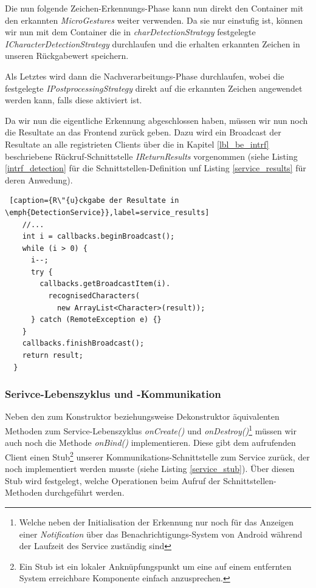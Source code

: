 Die nun folgende Zeichen-Erkennungs-Phase kann nun direkt den Container mit den erkannten \emph{MicroGestures} weiter verwenden. Da sie nur einstufig ist, können wir nun mit dem Container die in \emph{charDetectionStrategy} festgelegte \emph{ICharacterDetectionStrategy} durchlaufen und die erhalten erkannten Zeichen in unseren Rückgabewert speichern.

Als Letztes wird dann die Nachverarbeitungs-Phase durchlaufen, wobei die festgelegte \emph{IPostprocessingStrategy} direkt auf die erkannten Zeichen angewendet werden kann, falls diese aktiviert ist.

Da wir nun die eigentliche Erkennung abgeschlossen haben, müssen wir nun noch die Resultate an das Frontend zurück geben. Dazu wird ein Broadcast der Resultate an alle registrieten Clients über die in Kapitel \ref{lbl_be_intrf} beschriebene Rückruf-Schnittstelle \emph{IReturnResults} vorgenommen (siehe Listing \ref{intrf_detection} für die Schnittstellen-Definition unf Listing \ref{service_results} für deren Anwedung).

\begin{lstlisting} [caption={R\"{u}ckgabe der Resultate in \emph{DetectionService}},label=service_results]
    //...
    int i = callbacks.beginBroadcast();
    while (i > 0) {
      i--;
      try {
        callbacks.getBroadcastItem(i).
          recognisedCharacters(
            new ArrayList<Character>(result));
      } catch (RemoteException e) {}
    }
    callbacks.finishBroadcast();
    return result;
  }
\end{lstlisting}

\subsubsection{Serivce-Lebenszyklus und -Kommunikation}

Neben den zum Konstruktor beziehungsweise Dekonstruktor äquivalenten Methoden zum Service-Lebenszyklus \emph{onCreate()} und \emph{onDestroy()}\footnote{Welche neben der Initialisation der Erkennung nur noch für das Anzeigen einer \emph{Notification} über das Benachrichtigungs-System von Android während der Laufzeit des Service zuständig sind} müssen wir auch noch die Methode \emph{onBind()} implementieren. Diese gibt dem aufrufenden Client einen Stub\footnote{Ein Stub ist ein lokaler Anknüpfungspunkt um eine auf einem entfernten System erreichbare Komponente einfach anzusprechen.} unserer Kommunikations-Schnittstelle zum Service zurück, der noch implementiert werden musste (siehe Listing \ref{service_stub}). Über diesen Stub wird festgelegt, welche Operationen beim Aufruf der Schnittstellen-Methoden durchgeführt werden.

